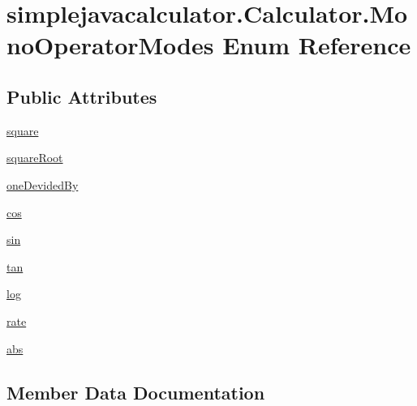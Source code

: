 \hypertarget{enumsimplejavacalculator_1_1_calculator_1_1_mono_operator_modes}{}\section{simplejavacalculator.\+Calculator.\+Mono\+Operator\+Modes Enum Reference}
\label{enumsimplejavacalculator_1_1_calculator_1_1_mono_operator_modes}
\subsection*{Public Attributes}
\begin{DoxyCompactItemize}
\item 
\mbox{\hyperlink{enumsimplejavacalculator_1_1_calculator_1_1_mono_operator_modes_a22d0395462d0c114076d1fef581e4ca3}{square}}
\item 
\mbox{\hyperlink{enumsimplejavacalculator_1_1_calculator_1_1_mono_operator_modes_a8e056218c74a0442a2d96d7e77e9725d}{square\+Root}}
\item 
\mbox{\hyperlink{enumsimplejavacalculator_1_1_calculator_1_1_mono_operator_modes_a2d990ad0144af21db04d684d4d22d610}{one\+Devided\+By}}
\item 
\mbox{\hyperlink{enumsimplejavacalculator_1_1_calculator_1_1_mono_operator_modes_ae293ff9c9b669c9e287481c4ad44f462}{cos}}
\item 
\mbox{\hyperlink{enumsimplejavacalculator_1_1_calculator_1_1_mono_operator_modes_a2992e4c91fc7998ce449f5c1b6d07422}{sin}}
\item 
\mbox{\hyperlink{enumsimplejavacalculator_1_1_calculator_1_1_mono_operator_modes_a718972148e1a4f7aa667c0b422321f03}{tan}}
\item 
\mbox{\hyperlink{enumsimplejavacalculator_1_1_calculator_1_1_mono_operator_modes_aee6d7ad650bd97b2b906e022635bc7ec}{log}}
\item 
\mbox{\hyperlink{enumsimplejavacalculator_1_1_calculator_1_1_mono_operator_modes_adcae13746c1b2f60a8d7de426d5dd6ec}{rate}}
\item 
\mbox{\hyperlink{enumsimplejavacalculator_1_1_calculator_1_1_mono_operator_modes_ad939cc8595d6af4bcf83d44d8dba2a37}{abs}}
\end{DoxyCompactItemize}


\subsection{Member Data Documentation}
\mbox{\label{enumsimplejavacalculator_1_1_calculator_1_1_mono_operator_modes_ad939cc8595d6af4bcf83d44d8dba2a37}} 
